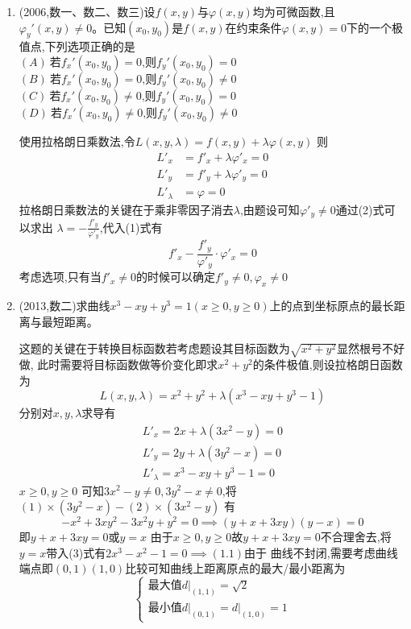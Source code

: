 \documentclass[12pt, a4paper, oneside, UTF8]{ctexbook}
\begin{document}
\begin{enumerate}[label=\arabic*.,start=11]
    \item (2006,数一、数二、数三)设$f(x,y)$与$\varphi(x,y)$均为可微函数,且$\varphi_y'(x,y)\neq 0$。已知$(x_0,y_0)$是$f(x,y)$在约束条件$\varphi(x,y)=0$下的一个极值点,下列选项正确的是 \\
    $(A)\ \text{若}f_x'(x_0,y_0)=0\text{,则}f_y'(x_0,y_0)=0$ \\
    $(B)\ \text{若}f_x'(x_0,y_0)=0\text{,则}f_y'(x_0,y_0)\neq 0$ \\
    $(C)\ \text{若}f_x'(x_0,y_0)\neq 0\text{,则}f_y'(x_0,y_0)=0$ \\
    $(D)\ \text{若}f_x'(x_0,y_0)\neq 0\text{,则}f_y'(x_0,y_0)\neq 0$
    
    \begin{solution}
    使用拉格朗日乘数法,令$L(x,y,\lambda)=f(x,y)+\lambda\varphi(x,y)$ 则
    \begin{align}
        L'_x &= f'_x + \lambda\varphi'_x = 0 \tag{1} \\
        L'_y &= f'_y + \lambda\varphi'_y = 0 \tag{2} \\
        L'_\lambda &= \varphi = 0 \tag{3}
    \end{align}
    拉格朗日乘数法的关键在于{\color{red}乘非零因子消去$\lambda$},由题设可知$\varphi'_y\neq 0$通过(2)式可以求出
    $\lambda = \displaystyle - \frac{f'_y}{\varphi'_y}$,代入(1)式有
    $$
    f'_x - \frac{f'_y}{\varphi'_y}\cdot\varphi'_x = 0
    $$
    考虑选项,只有当$f'_x\neq 0$的时候可以确定$f'_y\neq 0,\varphi_x\neq 0$
    \end{solution}
    
    \item (2013,数二)求曲线$x^3-xy+y^3=1(x\geq 0,y\geq 0)$上的点到坐标原点的最长距离与最短距离。
    
    \begin{solution}
    {\color{red} 这题的关键在于转换目标函数}若考虑题设其目标函数为$\sqrt{x^2+y^2}$显然根号不好做,
    此时需要将目标函数做等价变化即求$x^2+y^2$的条件极值,则设拉格朗日函数为
    $$
    L(x,y,\lambda)=x^2+y^2+\lambda(x^3-xy+y^3-1)
    $$
    分别对$x,y,\lambda$求导有
    \begin{align}
        L'_x=2x+\lambda(3x^2-y)=0\tag{1} \\
        L'_y=2y+\lambda(3y^2-x)=0\tag{2} \\
        L'_\lambda=x^3-xy+y^3-1=0\tag{3}
    \end{align}
    $x\geq 0, y\geq 0$ 可知$3x^2 - y\neq 0, 3y^2 - x\neq 0$,将$(1)\times (3y^2-x) - (2)\times (3x^2 - y)$ 有
    $$
    -x^2 + 3xy^2 - 3x^2y+y^2 = 0 \implies (y+x+3xy)(y-x)=0
    $$
    即$y+x+3xy=0\text{或}y=x$ 由于$x\geq 0, y\geq 0$故$y+x+3xy=0$不合理舍去,将$y=x$带入(3)式有$2x^3-x^2-1=0\implies (1.1)$由于
    曲线不封闭,需要考虑曲线端点即$(0,1)(1,0)$比较可知曲线上距离原点的最大/最小距离为
    $$
    \begin{cases}
        \text{最大值} d\big|_{(1,1)}=\sqrt{2} \\
        \text{最小值} d\big|_{(0,1)} = d\big|_{(1,0)} = 1
    \end{cases}
    $$
    \end{solution}
\end{enumerate}
\end{document}
